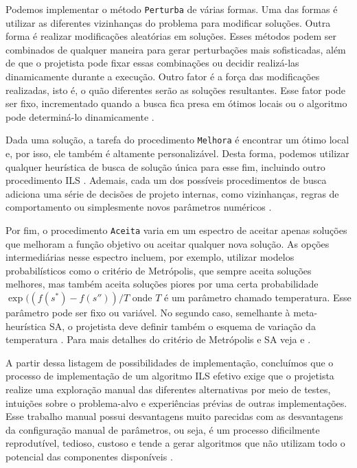 Podemos implementar o método \texttt{Perturba} de várias formas. Uma das formas é utilizar as diferentes vizinhanças do problema para modificar soluções. Outra forma é realizar modificações aleatórias em soluções. Esses métodos podem ser combinados de qualquer maneira para gerar perturbações mais sofisticadas, além de que o projetista pode fixar essas combinações ou decidir realizá-las dinamicamente durante a execução. Outro fator é a força das modificações realizadas, isto é, o quão diferentes serão as soluções resultantes. Esse fator pode ser fixo, incrementado quando a busca fica presa em ótimos locais ou o algoritmo pode determiná-lo dinamicamente \citep{stutzle2018automated, lourencco2018iterated}.

Dada uma solução, a tarefa do procedimento \texttt{Melhora} é encontrar um ótimo local e, por isso, ele também é altamente personalizável. Desta forma, podemos utilizar qualquer heurística de busca de solução única para esse fim, incluindo outro procedimento \ac{ILS} \citep{talbi}. Ademais, cada um dos possíveis procedimentos de busca adiciona uma série de decisões de projeto internas, como vizinhanças, regras de comportamento ou simplesmente novos parâmetros numéricos \citep{stutzle2018automated}.

Por fim, o procedimento \texttt{Aceita} varia em um espectro de aceitar apenas soluções que melhoram a função objetivo ou aceitar qualquer nova solução. As opções intermediárias nesse espectro incluem, por exemplo, utilizar modelos probabilísticos como o critério de Metrópolis, que sempre aceita soluções melhores, mas também aceita soluções piores por uma certa probabilidade $\operatorname{exp}((f(s^*)-f(s''))\slash T$ onde $T$ é um parâmetro chamado temperatura. Esse parâmetro pode ser fixo ou variável. No segundo caso, semelhante à meta-heurística \ac{SA}, o projetista deve definir também o esquema de variação da temperatura \citep{lourencco2018iterated}. Para mais detalhes do critério de Metrópolis e \ac{SA} veja \cite{delahaye2018simulated} e \cite{talbi}.

A partir dessa listagem de possibilidades de implementação, concluímos que o processo de implementação de um algoritmo \ac{ILS} efetivo exige que o projetista realize uma exploração manual das diferentes alternativas por meio de testes, intuições sobre o problema-alvo e experiências prévias de outras implementações. Esse trabalho manual possui desvantagens muito parecidas com as desvantagens da configuração manual de parâmetros, ou seja, é um processo dificilmente reprodutível, tedioso, custoso e tende a gerar algoritmos que não utilizam todo o potencial das componentes disponíveis \citep{stutzle2018automated}.

